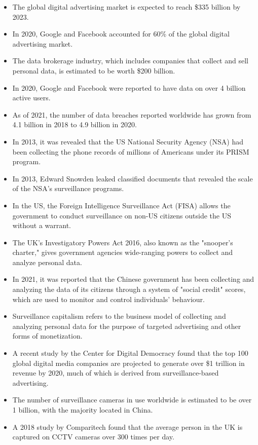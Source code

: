 \begin{itemize}
\item The global digital advertising market is expected to reach \$335 billion by 2023.
\item In 2020, Google and Facebook accounted for 60\% of the global digital advertising market.
\item The data brokerage industry, which includes companies that collect and sell personal data, is estimated to be worth \$200 billion.
\item In 2020, Google and Facebook were reported to have data on over 4 billion active users.
\item As of 2021, the number of data breaches reported worldwide has grown from 4.1 billion in 2018 to 4.9 billion in 2020.
\item In 2013, it was revealed that the US National Security Agency (NSA) had been collecting the phone records of millions of Americans under its PRISM program.
\item In 2013, Edward Snowden leaked classified documents that revealed the scale of the NSA's surveillance programs.
\item In the US, the Foreign Intelligence Surveillance Act (FISA) allows the government to conduct surveillance on non-US citizens outside the US without a warrant.
\item The UK's Investigatory Powers Act 2016, also known as the "snooper's charter," gives government agencies wide-ranging powers to collect and analyze personal data.
\item In 2021, it was reported that the Chinese government has been collecting and analyzing the data of its citizens through a system of "social credit" scores, which are used to monitor and control individuals' behaviour.
\item Surveillance capitalism refers to the business model of collecting and analyzing personal data for the purpose of targeted advertising and other forms of monetization.
\item A recent study by the Center for Digital Democracy found that the top 100 global digital media companies are projected to generate over \$1 trillion in revenue by 2020, much of which is derived from surveillance-based advertising.
\item The number of surveillance cameras in use worldwide is estimated to be over 1 billion, with the majority located in China.
\item A 2018 study by Comparitech found that the average person in the UK is captured on CCTV cameras over 300 times per day.

\end{itemize}
